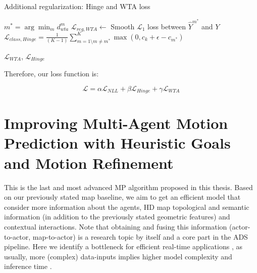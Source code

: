 \begin{algorithm}[H]
	\SetAlgoLined
	\caption{Additional regularization: Hinge and WTA loss}
	\label{alg:4_efficient_baselines_additional_regularization}
	
	
	
	
	
	$m^* = \arg\min_{m} d_{wta}^{m}$\;
	$\mathcal{L}_{reg,WTA} \gets $ Smooth $\mathcal{L}_1$ loss between $\hat{Y}^{m^*}$ and $Y$\;
	$\mathcal{L}_{class,Hinge} = \frac{1}{(K-1)}\sum_{m=1 \setminus m \neq m^*}^{K} \max( 0, c_{k} + \epsilon - c_{m^*})$\;
	
	\Return $\mathcal{L}_{WTA}$, $\mathcal{L}_{Hinge}$\;
	
\end{algorithm}

Therefore, our loss function is:

\begin{equation}
	\mathcal{L} = \alpha \mathcal{L}_{NLL} + \beta \mathcal{L}_{Hinge} + \gamma \mathcal{L}_{WTA}
	\label{eq:loss}
\end{equation}

\section{Improving Multi-Agent Motion Prediction with Heuristic Goals and Motion Refinement}
\label{sec:4_improving_efficiency}

This is the last and most advanced \ac{MP} algorithm proposed in this thesis. Based on our previously stated map baseline, we aim to get an efficient model that consider more information about the agents, HD map topological and semantic information (in addition to the previously stated geometric features) and contextual interactions. Note that obtaining and fusing this information (\eg actor-to-actor, map-to-actor) is a research topic by itself \cite{varadarajan2022multipath++, zeng2021lanercnn, liang2020learning} and a core part in the \ac{ADS} pipeline. Here we identify a bottleneck for efficient real-time applications \cite{KATRAKAZAS2015416realtime, gomez2021smartmot}, as usually, more (complex) data-inputs implies higher model complexity and inference time \cite{gao2020vectornet}. 

